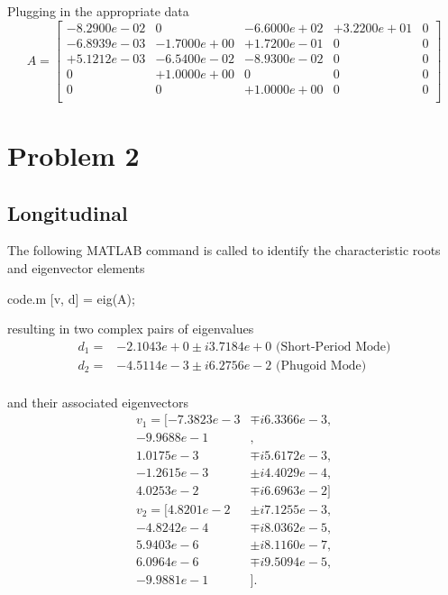 \documentclass[12pt]{article}
\begin{document}
\noindent Plugging in the appropriate data
\begin{equation*}
A =
\begin{bmatrix}
  -8.2900e-02  &           0  & -6.6000e+02  & +3.2200e+01 &            0 \\
  -6.8939e-03  & -1.7000e+00  & +1.7200e-01  &           0 &            0 \\
  +5.1212e-03  & -6.5400e-02  & -8.9300e-02  &           0 &            0 \\
            0  & +1.0000e+00  &           0  &           0 &            0 \\
            0  &           0  & +1.0000e+00  &           0 &            0 \\
\end{bmatrix}
\end{equation*}

\newpage
\section{Problem 2}
\subsection{Longitudinal}
\noindent The following MATLAB command is called to identify the characteristic roots and eigenvector elements
\begin{filecontents*}{code.m}
[v, d] = eig(A);
\end{filecontents*}


\noindent resulting in two complex pairs of eigenvalues
\begin{equation*}
\begin{split}
d_1 =& -2.1043e+0 \pm i 3.7184e+0 \mbox{ (Short-Period Mode)} \\
d_2 =& -4.5114e-3 \pm i 6.2756e-2 \mbox{ (Phugoid Mode)}\\
\end{split}
\end{equation*}

\noindent and their associated eigenvectors
\begin{equation*}
\begin{split}
v_1 = [-7.3823e-3 & \mp i 6.3366e-3, \\
       -9.9688e-1 &,  \\
        1.0175e-3 & \mp i 5.6172e-3, \\
       -1.2615e-3 & \pm i 4.4029e-4, \\
        4.0253e-2 & \mp i 6.6963e-2] \\
v_2 = [ 4.8201e-2 & \pm i 7.1255e-3, \\
       -4.8242e-4 & \mp i 8.0362e-5,  \\
        5.9403e-6 & \pm i 8.1160e-7,  \\
        6.0964e-6 & \mp i 9.5094e-5, \\
       -9.9881e-1 &].
\end{split}
\end{equation*}
\end{document}
